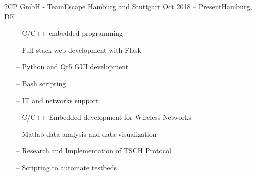 \documentclass[10pt,a4paper]{altacv}
\begin{document}

%

\begin{fullwidth}
    \makecvheader
\end{fullwidth}

%




{2CP GmbH - TeamEscape Hamburg and Stuttgart}
{Oct 2018 -- Present}{Hamburg, DE}

\begin{itemize}
    \setlength{\itemindent}{0.5em}
    \item[--] \small{C/C++ embedded programming }
    \item[--] \small{Full stack web development with Flask}
    \item[--] \small{Python and Qt5 GUI development}
    \item[--] \small{Bash scripting}
    \item[--] \small{IT and networks support}
\end{itemize}

\medskip



\begin{itemize}
    \setlength{\itemindent}{0.5em}
    \item[--]   \small{C/C++ Embedded development for Wireless Networks}
    \item[--]   \small{Matlab data analysis and data visualization}
    \item[--]   \small{Research and Implementation of TSCH Protocol}
    \item[--]   \small{Scripting to automate testbeds}
\end{itemize}
\end{document}
